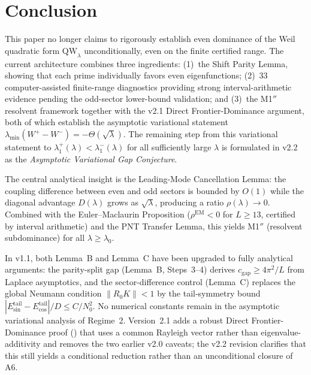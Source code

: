 \documentclass[12pt,a4paper]{article}
\theoremstyle{definition}
\theoremstyle{remark}
\begin{document}
\section{Conclusion}

This paper no longer claims to rigorously establish even dominance of the Weil
quadratic form $\mathrm{QW}_\lambda$ unconditionally, even on the finite
certified range. The current architecture combines three ingredients: (1)~the
Shift Parity Lemma, showing that each prime individually favors even
eigenfunctions; (2)~33 computer-assisted finite-range diagnostics providing
strong interval-arithmetic evidence pending the odd-sector lower-bound
validation; and (3)~the M1$''$ resolvent framework together with the v2.1 Direct
Frontier-Dominance argument, both of which establish the asymptotic
variational statement $\lambda_{\min}(W^+-W^-)=-\Theta(\sqrt\lambda)$. The
remaining step from this variational statement to
$\lambda_1^+(\lambda)<\lambda_1^-(\lambda)$ for all sufficiently large
$\lambda$ is formulated in v2.2 as the \emph{Asymptotic Variational Gap
Conjecture}.

The central analytical insight is the Leading-Mode Cancellation Lemma: the coupling difference between even and odd sectors is bounded by $O(1)$ while the diagonal advantage $D(\lambda)$ grows as $\sqrt{\lambda}$, producing a ratio $\rho(\lambda) \to 0$. Combined with the Euler--Maclaurin Proposition ($\rho^{\mathrm{EM}} < 0$ for $L \geq 13$, certified by interval arithmetic) and the PNT Transfer Lemma, this yields M1$''$ (resolvent subdominance) for all $\lambda \geq \lambda_0$.

In v1.1, both Lemma~B and Lemma~C have been upgraded to fully analytical
arguments: the parity-split gap (Lemma~B, Steps~3--4) derives
$c_{\mathrm{gap}} \geq 4\pi^2/L$ from Laplace asymptotics, and the
sector-difference control (Lemma~C) replaces the global Neumann condition
$\|R_0 K\| < 1$ by the tail-symmetry bound
$|E_{\sin}^{\mathrm{tail}} - E_{\cos}^{\mathrm{tail}}|/D \leq C/N_0^2$. No
numerical constants remain in the asymptotic variational analysis of
Regime~2. Version~2.1 adds a robust Direct Frontier-Dominance proof
() that uses a common Rayleigh vector rather than
eigenvalue-additivity and removes the two earlier v2.0 caveats; the v2.2
revision clarifies that this still yields a conditional reduction rather than
an unconditional closure of A6.
\end{document}

